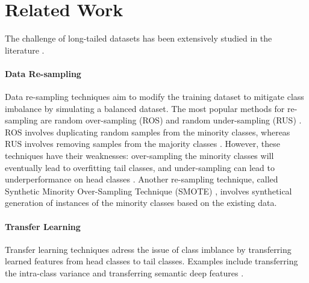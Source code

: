 


\section{Related Work}
The challenge of long-tailed datasets has been extensively studied in the literature \cite{zhang2023deep,zhang2024systematicreviewlongtailedlearning}. %


\paragraph{Data Re-sampling}
Data re-sampling techniques aim to modify the training dataset to mitigate class imbalance by simulating a balanced dataset. The most popular methods for re-sampling are random over-sampling (ROS) and random under-sampling (RUS) \cite{Chawla_2002,han2005}. ROS involves duplicating random samples from the minority classes, whereas RUS involves removing samples from the majority classes \cite{zhang2023deep,han2005}. However, these techniques have their weaknesses: over-sampling the minority classes will eventually lead to overfitting tail classes, and under-sampling can lead to underperformance on head classes \cite{zhang2023deep}. Another re-sampling technique, called Synthetic Minority Over-Sampling Technique (SMOTE) \cite{Chawla_2002}, involves synthetical generation of instances of the minority classes based on the existing data. 

\paragraph{Transfer Learning}
Transfer learning techniques adress the issue of class imblance by transferring learned features from head classes to tail classes. Examples include transferring the intra-class variance \cite{yin2019featuretransferlearningdeep} and transferring semantic deep features \cite{liu2019largescalelongtailedrecognitionopen}.

